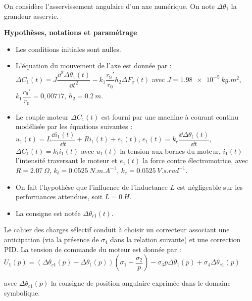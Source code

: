\setcounter{exo}{0}

On considère l'asservissement angulaire d'un axe numérique. On note $\Delta \theta_1$ la grandeur asservie.

\textbf{Hypothèses, notations et paramétrage}

\begin{itemize}
\item Les conditions initiales sont nulles.
\item L'équation du mouvement de l’axe est donnée par : $\Delta C_1(t) = J \dfrac{\dd^2 \Delta \theta_1(t)}{\dd t^2}-k_1 \dfrac{r_9'}{r_0}h_2 \Delta F_x(t)$ avec $J=\SI{1,98e-5}{kg.m^2}$, $k_1 \dfrac{r_9'}{r_0} = 0,00717$, $h_2=\SI{0,2}{m}$. 
\item Le couple moteur $\Delta C_1(t)$ est fourni par une machine à courant continu modélisée par les équations suivantes : $u_1(t)=L\dfrac{\dd i_1(t)}{\dd t}+Ri_1(t) + e_1(t)$, $e_1(t)=k_e \dfrac{\dd \Delta \theta_1(t)}{\dd t}$, $\Delta C_1(t)=k_t i_1(t)$ avec $u_1(t)$ la tension aux bornes du moteur, $i_1(t)$ l’intensité traversant le moteur et $e_1(t)$ la force contre
électromotrice, avec $R=\SI{2,07}{\Omega}$,
$k_t=\SI{0,0525}{N.m.A^{-1}}$, $k_e=\SI{0,0525}{V.s.rad^{-1}}$.
\item On fait l’hypothèse que l’influence de l’inductance $L$ est négligeable sur les performances attendues, soit $L=\SI{0}{H}$.
\item La consigne est notée $\Delta \theta_{c1}(t)$.
\end{itemize}

Le cahier des charges sélectif conduit à choisir un correcteur associant une anticipation (via la présence de $\sigma_4$ dans la relation suivante) et une correction PID. La tension de commande du moteur est donnée par : 
$U_1(p)=\left( \Delta \theta_{c 1}(p)  - \Delta \theta_{1}(p)  \right) \left( \sigma_1 +\dfrac{\sigma_2}{p}\right) - \sigma_3 p \Delta \theta_1(p) + \sigma_4 \Delta \theta_{c1}(p)
 $

avec $\Delta \theta_{c1}(p)$ la consigne de position angulaire exprimée dans le domaine symbolique.



\ifprof
\begin{corrige}
\end{corrige}
\else
\fi


